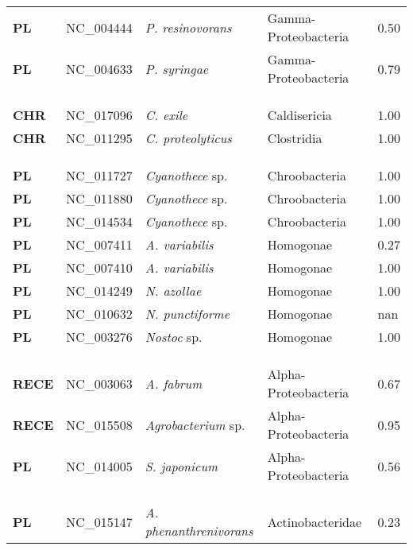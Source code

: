 \begin{adjustwidth}{-3cm}{2cm}
{\begin{supertabular}{>{\bfseries}l|p{0.1\textwidth}p{0.14\textwidth}l|l}
PL & NC\_004444 & \textit{P. resinovorans} & Gamma-Proteobacteria & 0.50\\
PL & NC\_004633 & \textit{P. syringae} & Gamma-Proteobacteria & 0.79\\
\\
\\
\hline\\
CHR & NC\_017096 & \textit{C. exile} & Caldisericia & 1.00\\
CHR & NC\_011295 & \textit{C. proteolyticus} & Clostridia & 1.00\\
\\
\\
\hline\\
PL & NC\_011727 & \textit{Cyanothece} sp. & Chroobacteria & 1.00\\
PL & NC\_011880 & \textit{Cyanothece} sp. & Chroobacteria & 1.00\\
PL & NC\_014534 & \textit{Cyanothece} sp. & Chroobacteria & 1.00\\
PL & NC\_007411 & \textit{A. variabilis} & Homogonae & 0.27\\
PL & NC\_007410 & \textit{A. variabilis} & Homogonae & 1.00\\
PL & NC\_014249 & \textit{N. azollae} & Homogonae & 1.00\\
PL & NC\_010632 & \textit{N. punctiforme} & Homogonae & nan\\
PL & NC\_003276 & \textit{Nostoc} sp. & Homogonae & 1.00\\
\\
\\
\hline\\
RECE & NC\_003063 &  \textit{A. fabrum} & Alpha-Proteobacteria & 0.67\\
RECE & NC\_015508 &  \textit{Agrobacterium} sp. & Alpha-Proteobacteria & 0.95\\
PL & NC\_014005 & \textit{S. japonicum} & Alpha-Proteobacteria & 0.56\\
\\
\\
\hline\\
PL & NC\_015147 & \textit{A. phenanthrenivorans} & Actinobacteridae & 0.23\\

\end{supertabular}}
\end{adjustwidth}
